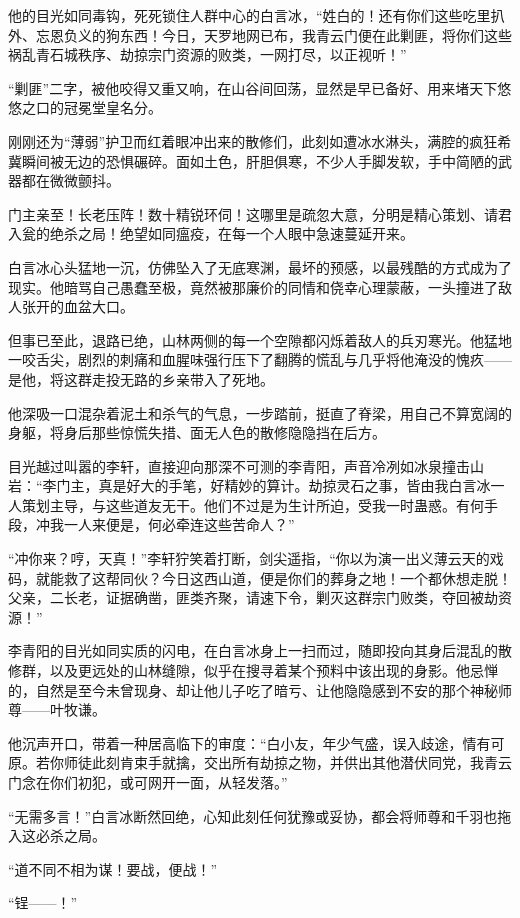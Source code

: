 他的目光如同毒钩，死死锁住人群中心的白言冰，“姓白的！还有你们这些吃里扒外、忘恩负义的狗东西！今日，天罗地网已布，我青云门便在此剿匪，将你们这些祸乱青石城秩序、劫掠宗门资源的败类，一网打尽，以正视听！”

“剿匪”二字，被他咬得又重又响，在山谷间回荡，显然是早已备好、用来堵天下悠悠之口的冠冕堂皇名分。

刚刚还为“薄弱”护卫而红着眼冲出来的散修们，此刻如遭冰水淋头，满腔的疯狂希冀瞬间被无边的恐惧碾碎。面如土色，肝胆俱寒，不少人手脚发软，手中简陋的武器都在微微颤抖。

门主亲至！长老压阵！数十精锐环伺！这哪里是疏忽大意，分明是精心策划、请君入瓮的绝杀之局！绝望如同瘟疫，在每一个人眼中急速蔓延开来。

白言冰心头猛地一沉，仿佛坠入了无底寒渊，最坏的预感，以最残酷的方式成为了现实。他暗骂自己愚蠢至极，竟然被那廉价的同情和侥幸心理蒙蔽，一头撞进了敌人张开的血盆大口。

但事已至此，退路已绝，山林两侧的每一个空隙都闪烁着敌人的兵刃寒光。他猛地一咬舌尖，剧烈的刺痛和血腥味强行压下了翻腾的慌乱与几乎将他淹没的愧疚——是他，将这群走投无路的乡亲带入了死地。

他深吸一口混杂着泥土和杀气的气息，一步踏前，挺直了脊梁，用自己不算宽阔的身躯，将身后那些惊慌失措、面无人色的散修隐隐挡在后方。

目光越过叫嚣的李轩，直接迎向那深不可测的李青阳，声音冷冽如冰泉撞击山岩：“李门主，真是好大的手笔，好精妙的算计。劫掠灵石之事，皆由我白言冰一人策划主导，与这些道友无干。他们不过是为生计所迫，受我一时蛊惑。有何手段，冲我一人来便是，何必牵连这些苦命人？”

“冲你来？哼，天真！”李轩狞笑着打断，剑尖遥指，“你以为演一出义薄云天的戏码，就能救了这帮同伙？今日这西山道，便是你们的葬身之地！一个都休想走脱！父亲，二长老，证据确凿，匪类齐聚，请速下令，剿灭这群宗门败类，夺回被劫资源！”

李青阳的目光如同实质的闪电，在白言冰身上一扫而过，随即投向其身后混乱的散修群，以及更远处的山林缝隙，似乎在搜寻着某个预料中该出现的身影。他忌惮的，自然是至今未曾现身、却让他儿子吃了暗亏、让他隐隐感到不安的那个神秘师尊——叶牧谦。

他沉声开口，带着一种居高临下的审度：“白小友，年少气盛，误入歧途，情有可原。若你师徒此刻肯束手就擒，交出所有劫掠之物，并供出其他潜伏同党，我青云门念在你们初犯，或可网开一面，从轻发落。”

“无需多言！”白言冰断然回绝，心知此刻任何犹豫或妥协，都会将师尊和千羽也拖入这必杀之局。

“道不同不相为谋！要战，便战！”

“锃——！”

